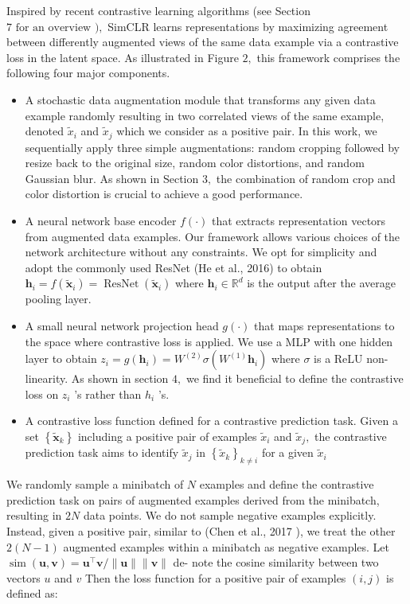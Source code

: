 \documentclass[]{IEEEtran}
\begin{document}
Inspired by recent contrastive learning algorithms (see Section $7 \text { for an overview }),$ SimCLR learns representations by maximizing agreement between differently augmented views of the same data example via a contrastive loss in the latent space. As illustrated in Figure $2,$ this framework comprises the following four major components.

\begin{itemize}
    \item A stochastic data augmentation module that transforms any given data example randomly resulting in two correlated views of the same example, denoted $\tilde{x}_{i}$ and $\tilde{x}_{j}$ which we consider as a positive pair. In this work, we sequentially apply three simple augmentations: random cropping followed by resize back to the original size, random color distortions, and random Gaussian blur. As shown in Section $3,$ the combination of random crop and color distortion is crucial to achieve a good performance.
    \item A neural network base encoder $f(\cdot)$ that extracts representation vectors from augmented data examples. Our framework allows various choices of the network architecture without any constraints. We opt for simplicity and adopt the commonly used ResNet (He et al., 2016) to obtain $\boldsymbol{h}_{i}=f\left(\tilde{\boldsymbol{x}}_{i}\right)=\operatorname{ResNet}\left(\tilde{\boldsymbol{x}}_{i}\right)$ where $\boldsymbol{h}_{i} \in \mathbb{R}^{d}$ is the output after the average pooling layer.
    
     \item A small neural network projection head $g(\cdot)$ that maps representations to the space where contrastive loss is applied. We use a MLP with one hidden layer to obtain $z_{i}=g\left(\boldsymbol{h}_{i}\right)=W^{(2)} \sigma\left(W^{(1)} \boldsymbol{h}_{i}\right)$ where $\sigma$ is a ReLU non-
linearity. As shown in section $4,$ we find it beneficial to define the contrastive loss on $z_{i}$ 's rather than $h_{i}$ 's.
     \item A contrastive loss function defined for a contrastive prediction task. Given a set $\left\{\tilde{\boldsymbol{x}}_{k}\right\}$ including a positive pair of examples $\tilde{x}_{i}$ and $\tilde{x}_{j},$ the contrastive prediction task aims to identify $\tilde{x}_{j}$ in $\left\{\tilde{x}_{k}\right\}_{k \neq i}$ for a given $\tilde{x}_{i}$
\end{itemize}
We randomly sample a minibatch of $N$ examples and define the contrastive prediction task on pairs of augmented examples derived from the minibatch, resulting in $2 N$ data points. We do not sample negative examples explicitly. Instead, given a positive pair, similar to (Chen et al., 2017 ), we treat the other $2(N-1)$ augmented examples within a minibatch as negative examples. Let $\operatorname{sim}(\boldsymbol{u}, \boldsymbol{v})=\boldsymbol{u}^{\top} \boldsymbol{v} /\|\boldsymbol{u}\|\|\boldsymbol{v}\|$ de-
note the cosine similarity between two vectors $u$ and $v$ Then the loss function for a positive pair of examples $(i, j)$ is defined as: 
\end{document}
